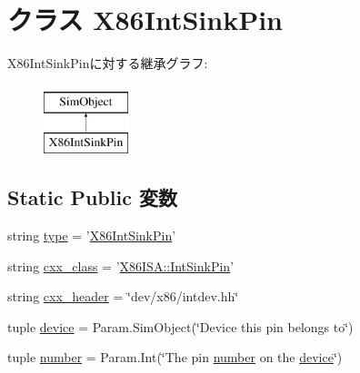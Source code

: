 \hypertarget{classX86IntPin_1_1X86IntSinkPin}{
\section{クラス X86IntSinkPin}
\label{classX86IntPin_1_1X86IntSinkPin}
}
X86IntSinkPinに対する継承グラフ:\begin{figure}[H]
\begin{center}
\leavevmode
\includegraphics[height=2cm]{classX86IntPin_1_1X86IntSinkPin}
\end{center}
\end{figure}
\subsection*{Static Public 変数}
\begin{DoxyCompactItemize}
\item 
string \hyperlink{classX86IntPin_1_1X86IntSinkPin_acce15679d830831b0bbe8ebc2a60b2ca}{type} = '\hyperlink{classX86IntPin_1_1X86IntSinkPin}{X86IntSinkPin}'
\item 
string \hyperlink{classX86IntPin_1_1X86IntSinkPin_a58cd55cd4023648e138237cfc0822ae3}{cxx\_\-class} = '\hyperlink{classX86ISA_1_1IntSinkPin}{X86ISA::IntSinkPin}'
\item 
string \hyperlink{classX86IntPin_1_1X86IntSinkPin_a17da7064bc5c518791f0c891eff05fda}{cxx\_\-header} = \char`\"{}dev/x86/intdev.hh\char`\"{}
\item 
tuple \hyperlink{classX86IntPin_1_1X86IntSinkPin_a1cd0f8935f73f0628450287bdefa57d2}{device} = Param.SimObject(\char`\"{}Device this pin belongs to\char`\"{})
\item 
tuple \hyperlink{classX86IntPin_1_1X86IntSinkPin_a629b7ca94b6a486bdc504ed959b90cc8}{number} = Param.Int(\char`\"{}The pin \hyperlink{classX86IntPin_1_1X86IntSinkPin_a629b7ca94b6a486bdc504ed959b90cc8}{number} on the \hyperlink{classX86IntPin_1_1X86IntSinkPin_a1cd0f8935f73f0628450287bdefa57d2}{device}\char`\"{})
\end{DoxyCompactItemize}


